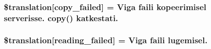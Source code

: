 \subsubsection[{\$translation}]{\setlength{\rightskip}{0pt plus 5cm}\$translation\mbox{[}\textquotesingle{}copy\+\_\+failed\textquotesingle{}\mbox{]} = \textquotesingle{}Viga faili kopeerimisel serverisse. copy() katkestati.\textquotesingle{}}\label{class_8upload_8et___e_e_8php_a783c9358bcf54a054545b50098bc679b}
\hypertarget{class_8upload_8et___e_e_8php_a01bea14c9fd5f353f62db44beabfcd42}{}
\subsubsection[{\$translation}]{\setlength{\rightskip}{0pt plus 5cm}\$translation\mbox{[}\textquotesingle{}reading\+\_\+failed\textquotesingle{}\mbox{]} = \textquotesingle{}Viga faili lugemisel.\textquotesingle{}}\label{class_8upload_8et___e_e_8php_a01bea14c9fd5f353f62db44beabfcd42}
